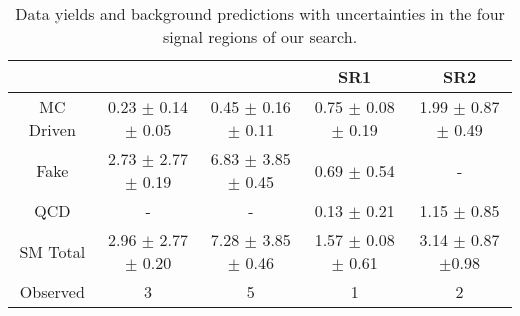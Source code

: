 \begin{table}[!Hhtb]
\begin{center}
\begin{tabular}{c|c|c|c|c}
\hline
\hline
		& \eTau & \muTau & \tauTau SR1 & \tauTau SR2 \\
\hline
MC Driven & 0.23 $\pm$ 0.14 $\pm$ 0.05 & 0.45 $\pm$ 0.16  $\pm$ 0.11  &  0.75 $\pm$ 0.08 $\pm$ 0.19 & 1.99 $\pm$ 0.87 $\pm$ 0.49  \\
Fake      & 2.73 $\pm$ 2.77 $\pm$ 0.19 & 6.83 $\pm$ 3.85  $\pm$ 0.45  &     0.69 $\pm$ 0.54         &           -                 \\
QCD       &             -              &            -                 &     0.13 $\pm$ 0.21         &         1.15 $\pm$ 0.85     \\
\hline
SM Total  & 2.96 $\pm$ 2.77 $\pm$ 0.20 & 7.28 $\pm$ 3.85  $\pm$ 0.46  & 1.57 $\pm$ 0.08 $\pm$ 0.61  & 3.14  $\pm$ 0.87 $\pm$0.98  \\
\hline
\hline
Observed  &               3            &                5             &             1               & 2     \\  
\hline
\hline
\end{tabular}
\caption{Data yields and background predictions with uncertainties in the four signal regions of our search. 
}
\label{tbl:yieldSysSummary}
\end{center}
\end{table}
